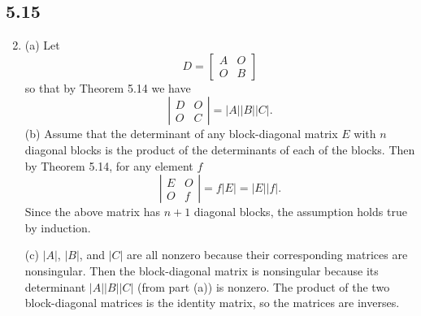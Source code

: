 \documentclass[a4paper, 12pt]{article}
\begin{document}
	\subsection*{5.15}
	\begin{enumerate}
		\setcounter{enumi}{1}
		\item (a) Let
		\[ D = \left[ \begin{array}{cc}
		A & O \\
		O & B
		\end{array} \right] \]
		so that by Theorem 5.14 we have
		\[ \left| \begin{array}{cc}
		D & O \\
		O & C
		\end{array} \right| = |A||B||C|. \]
		(b) Assume that the determinant of any block-diagonal matrix $E$ with $n$ diagonal blocks is the product of the determinants of each of the blocks. Then by Theorem 5.14, for any element $f$
		\[ \left| \begin{array}{cc}
		E & O \\
		O & f
		\end{array} \right| = f|E| = |E||f|. \]
		Since the above matrix has $n + 1$ diagonal blocks, the assumption holds true by induction. \par
		(c) $|A|$, $|B|$, and $|C|$ are all nonzero because their corresponding matrices are nonsingular. Then the block-diagonal matrix is nonsingular because its determinant $|A||B||C|$ (from part (a)) is nonzero. The product of the two block-diagonal matrices is the identity matrix, so the matrices are inverses.
		

\end{enumerate}
\end{document}
